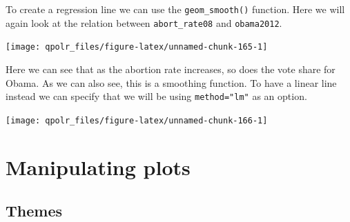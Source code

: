 \documentclass[12pt,oneside]{reedthesis}
\theoremstyle{definition}
\theoremstyle{definition}
\theoremstyle{definition}
\theoremstyle{remark}
\begin{document}
  To create a regression line we can use the \texttt{geom\_smooth()}
  function. Here we will again look at the relation between
  \texttt{abort\_rate08} and \texttt{obama2012}.
  \begin{Shaded}
  \begin{Highlighting}[]
  \NormalTok{(}\OperatorTok{+}
  \StringTok{  }\NormalTok{()}
  \end{Highlighting}
  \end{Shaded}
  \begin{center}\texttt{[image: qpolr\_files/figure-latex/unnamed-chunk-165-1]} \end{center}
  
  Here we can see that as the abortion rate increases, so does the vote
  share for Obama. As we can also see, this is a smoothing function. To
  have a linear line instead we can specify that we will be using
  \texttt{method="lm"} as an option.
  \begin{Shaded}
  \begin{Highlighting}[]
  \NormalTok{(}\OperatorTok{+}
  \StringTok{  }\NormalTok{(}\NormalTok{)}
  \end{Highlighting}
  \end{Shaded}
  \begin{center}\texttt{[image: qpolr\_files/figure-latex/unnamed-chunk-166-1]} \end{center}
  
  \section{Manipulating plots}\label{manipulating-plots}
  
  \subsection{Themes}\label{themes}
  
\end{document}
